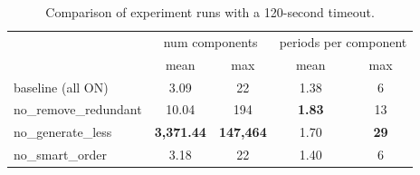 	
\begin{table}[H]
	\centering
	\begin{tabular}{l c c c c}
		\toprule
	& \multicolumn{2}{c}{num components} & \multicolumn{2}{c}{periods per component} \\
	\cmidrule(lr){2-3} \cmidrule(lr){4-5}
	& mean & max & mean & max \\
	\midrule
	baseline (all ON)         &   3.09    &   22    &   1.38   &    6   \\
	no\_remove\_redundant     &  10.04    &  194    &   \textbf{1.83}   &   13   \\
	no\_generate\_less        &\textbf{3{,}371.44}    &\textbf{147{,}464}   &   1.70   &   \textbf{29}   \\
	no\_smart\_order          &   3.18    &   22    &   1.40   &    6   \\
  \bottomrule
  \end{tabular}
  \caption{Comparison of experiment runs with a 120-second timeout.}
\end{table}



\newpage





